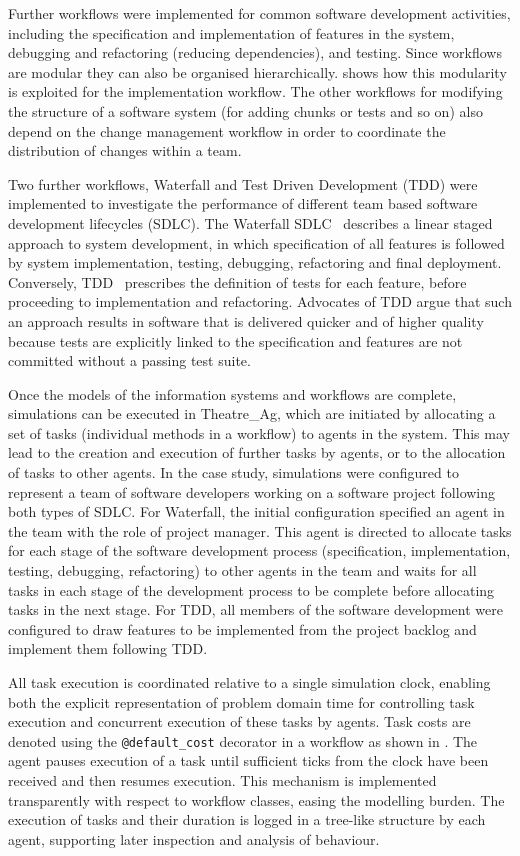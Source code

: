 \documentclass{llncs}
\begin{document}
Further workflows were implemented for common software development activities, including the specification and
implementation of features in the system, debugging and refactoring (reducing dependencies), and testing.  Since
workflows are modular they can also be organised hierarchically.   shows how this modularity is
exploited for the implementation workflow. The other workflows for modifying the structure of a software system (for
adding chunks or tests and so on) also depend on the change management workflow in order to coordinate the distribution
of changes within a team.

Two further workflows, Waterfall and Test Driven Development (TDD) were implemented to investigate the performance of
different team based software development lifecycles (SDLC).  The Waterfall SDLC~\citep{benington83production} describes
a linear staged approach to system development, in which specification of all features is followed by system
implementation, testing, debugging, refactoring and final deployment.  Conversely, TDD~\citep{beck02test} prescribes the
definition of tests for each feature, before proceeding to implementation and refactoring.  Advocates of TDD argue that
such an approach results in software that is delivered quicker and of higher quality because tests are explicitly linked
to the specification and features are not committed without a passing test suite.

Once the models of the information systems and workflows are complete, simulations can be executed in Theatre\_Ag, which
are initiated by allocating a set of tasks (individual methods in a workflow) to agents in the system. This may
lead to the creation and execution of further tasks by agents, or to the allocation of tasks to other agents.  In the
case study, simulations were configured to represent a team of software developers working on a software project
following both types of SDLC.  For Waterfall, the initial configuration specified an agent in the team with the role of
project manager.  This agent is directed to allocate tasks for each stage of the software development process
(specification, implementation, testing, debugging, refactoring) to other agents in the team and waits for all tasks in
each stage of the development process to be complete before allocating tasks in the next stage.  For TDD, all members of
the software development were configured to draw features to be implemented from the project backlog and implement them
following TDD.

All task execution is coordinated relative to a single simulation clock, enabling both the explicit representation of
problem domain time for controlling task execution and concurrent execution of these tasks by agents.  Task costs are
denoted using the \lstinline!@default_cost! decorator in a workflow as shown in .  The agent pauses
execution of a task until sufficient ticks from the clock have been received and then resumes execution.  This mechanism
is implemented transparently with respect to workflow classes, easing the modelling burden.  The execution of tasks and
their duration is logged in a tree-like structure by each agent, supporting later inspection and analysis of behaviour.
\end{document}
